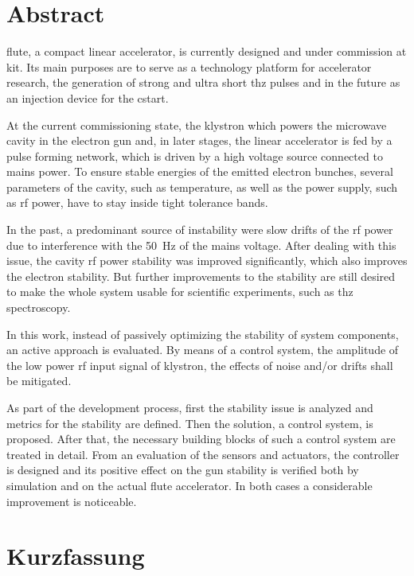 \section*{Abstract}
\gls{flute}, a compact linear accelerator, is currently designed and under commission at \gls{kit}. Its main purposes are to serve as a technology platform for accelerator research, the generation of strong and ultra short \gls{thz} pulses and in the future as an injection device for the \gls{cstart}.

At the current commissioning state, the klystron which powers the microwave cavity in the electron gun and, in later stages, the linear accelerator is fed by a pulse forming network, which is driven by a high voltage source connected to mains power. To ensure stable energies of the emitted electron bunches, several parameters of the cavity, such as temperature, as well as the power supply, such as \gls{rf} power, have to stay inside tight tolerance bands.

In the past, a predominant source of instability were slow drifts of the \gls{rf} power due to interference with the \SI{50}{\hertz} of the mains voltage. After dealing with this issue, the cavity \gls{rf} power stability was improved significantly, which also improves the electron stability. But further improvements to the stability are still desired to make the whole system usable for scientific experiments, such as \gls{thz} spectroscopy.

In this work, instead of passively optimizing the stability of system components, an active approach is evaluated. By means of a control system, the amplitude of the low power \gls{rf} input signal of klystron, the effects of noise and/or drifts shall be mitigated.

As part of the development process, first the stability issue is analyzed and metrics for the stability are defined. Then the solution, a control system, is proposed. After that, the necessary building blocks of such a control system are treated in detail. From an evaluation of the sensors and actuators, the controller is designed and its positive effect on the gun stability is verified both by simulation and on the actual \gls{flute} accelerator. In both cases a considerable improvement is noticeable. 


\section*{Kurzfassung}
